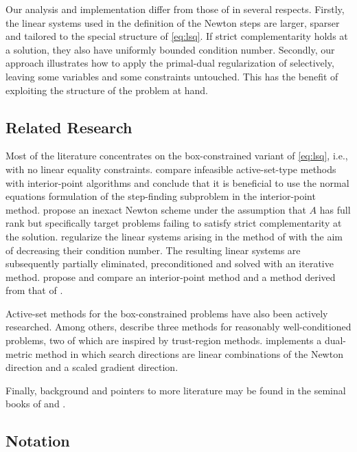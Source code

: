 \documentclass{amsart}
\begin{document}
Our analysis and implementation differ from those of
\cite{friedlander-orban-2012} in several respects. Firstly, the
linear systems used in the definition of the Newton steps are larger, sparser
and tailored to the special structure of \eqref{eq:lsq}. If strict
complementarity holds at a solution, they also have uniformly bounded condition
number. Secondly, our approach illustrates how to apply the primal-dual
regularization of \cite{friedlander-orban-2012} selectively, leaving some
variables and some constraints untouched. This has the benefit of exploiting
the structure of the problem at hand.

\subsection{Related Research}

Most of the literature concentrates on the box-constrained variant of
\eqref{eq:lsq}, i.e., with no linear equality constraints.
\cite{portugal-judice-vicente-1994} compare infeasible active-set-type methods
with interior-point algorithms and conclude that it is beneficial to use the
normal equations formulation of the step-finding subproblem in the
interior-point method. \cite{bellavia-macconi-morini-2006} propose an inexact
Newton scheme under the assumption that $A$ has full rank but specifically
target problems failing to satisfy strict complementarity at the solution.
\cite{bellavia-gondzio-morini-2008} regularize the linear systems arising in
the method of \cite{bellavia-macconi-morini-2006} with the aim of decreasing
their condition number. The resulting linear systems are subsequently partially
eliminated, preconditioned and solved with an iterative method.
\cite{bellavia-gondzio-morini-2011} propose and compare an interior-point
method and a method derived from that of \cite{barzilai-borwein-1988}.

Active-set methods for the box-constrained problems have also been actively
researched. Among others, \cite{bierlaire-toint-tuyttens-1991} describe three
methods for reasonably well-conditioned problems, two of which are inspired by
trust-region methods. \cite{friedlander-2007} implements a dual-metric method
in which search directions are linear combinations of the Newton direction and
a scaled gradient direction.

Finally, background and pointers to more literature may be found in the seminal
books of \cite{lawson-hanson-1995} and \cite{bjorck-1996}.


\subsection{Notation}
\end{document}
